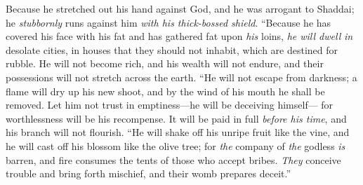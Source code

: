 \begin{biblechapter}
\verse Because he stretched out his hand against God, 
and he was arrogant to Shaddai;
\verse he \textit{stubbornly} runs against him 
\textit{with his thick-bossed shield}.
\verse “Because he has covered his face with his fat 
and has gathered fat upon \textit{his} loins,
\verse \textit{he will dwell} \textit{in} desolate cities, 
in houses that they should not inhabit, 
which are destined for rubble.
\verse He will not become rich, and his wealth will not endure, 
and their possessions will not stretch across the earth.
\verse “He will not escape from darkness; 
a flame will dry up his new shoot, 
and by the wind of his mouth he shall be removed.
\verse Let him not trust in emptiness—he will be deceiving himself— 
for worthlessness will be his recompense.
\verse It will be paid in full \textit{before his time}, 
and his branch will not flourish.
\verse “He will shake off his unripe fruit like the vine, 
and he will cast off his blossom like the olive tree;
\verse for \textit{the} company of \textit{the} godless \textit{is} barren, 
and fire consumes the tents of those who accept bribes.
\verse \textit{They} conceive trouble and bring forth mischief, 
and their womb prepares deceit.”
\end{biblechapter}

